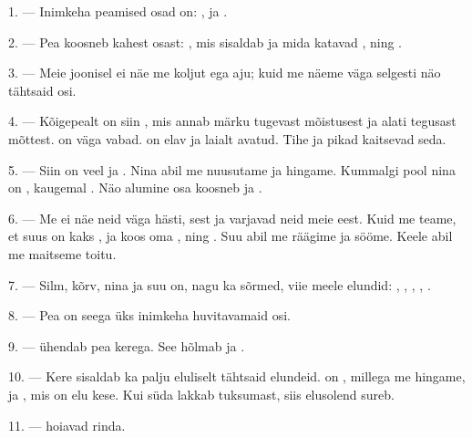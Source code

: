 \VUsaut{2.4mm}
\VUsaut{3.0mm}

\VUsaut{3.0mm}

1. --- Inimkeha peamised osad on: ,  ja .

2. --- Pea koosneb kahest osast: , mis sisaldab  ja mida
katavad , ning .

3. --- Meie joonisel ei näe me koljut ega aju; kuid me näeme väga selgesti näo
tähtsaid osi.

4. --- Kõigepealt on siin , mis annab märku tugevast mõistusest ja alati
tegusast mõttest.  on väga vabad.  on elav ja laialt
avatud. Tihe  ja pikad  kaitsevad seda.

5. --- Siin on veel  ja . Nina abil me nuusutame ja
hingame. Kummalgi pool nina on , kaugemal . Näo alumine
osa koosneb  ja .

6. --- Me ei näe neid väga hästi, sest  ja  varjavad
neid meie eest. Kuid me teame, et suus on kaks ,  ja
 koos oma , ning . Suu abil me räägime
ja sööme. Keele abil me maitseme toitu.

7. --- Silm, kõrv, nina ja suu on, nagu ka sõrmed, viie meele elundid:
, , ,
, .

8. --- Pea on seega üks inimkeha huvitavamaid osi.

\VUsaut{4.4mm}
\VUsaut{3.0mm}

9. ---  ühendab pea kerega. See hõlmab  ja .

10. --- Kere sisaldab ka palju eluliselt tähtsaid elundeid.  on
, millega me hingame, ja , mis on elu kese. Kui süda
lakkab tuksumast, siis elusolend sureb.

11. ---  hoiavad rinda.

